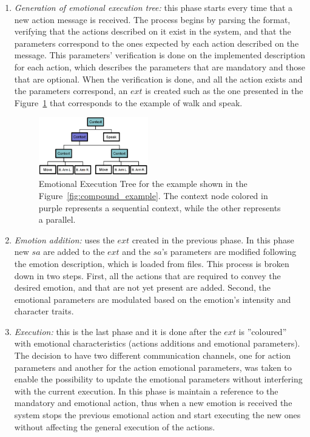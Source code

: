 \begin{enumerate}
	\item \textit{Generation of emotional execution tree:} this phase starts every time that a new action message is received. The process begins by parsing the format, verifying that the actions described on it exist in the system, and that the parameters correspond to the ones expected by each action described on the message. This parameters' verification is done on the implemented description for each action, which describes the parameters that are mandatory and those that are optional. When the verification is done, and all the action exists and  the parameters correspond, an $ext$ is created such as the one presented in the Figure~\ref{fig:reference} that corresponds to the example of walk and speak.
	\begin{figure}
		\centering
	\includegraphics[width=0.45\textwidth]{./Images/Representation.png}
	\caption{Emotional Execution Tree for the example shown in the Figure~\ref{fig:compound_example}. The context node colored in purple represents a sequential context, while the other represents a parallel.}
	\label{fig:reference}
	\end{figure}
	\item \textit{Emotion addition:} uses the $ext$ created in the previous phase. In this phase new $sa$ are added to the $ext$ and the $sa$'s parameters are modified following the emotion description, which is loaded from files. This process is broken down in two steps. First, all the actions that are required to convey the desired emotion, and that are not yet present are added. Second, the emotional parameters are modulated based on the emotion's intensity and character traits.
	\item \textit{Execution:} this is the last phase and it is done after the $ext$ is ''coloured'' with emotional characteristics (actions additions and emotional parameters). The decision to have two different communication channels, one for action parameters and another for the action emotional parameters, was taken to enable the possibility to update the emotional parameters without interfering with the current execution. In this phase is maintain a reference to the mandatory and emotional action, thus when a new emotion is received the system stops the previous emotional action and start executing the new ones without affecting the general execution of the actions.
\end{enumerate}
